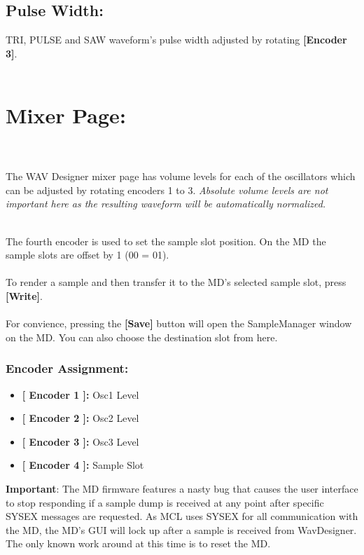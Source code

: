 \subsection{Pulse Width:}
TRI, PULSE and SAW waveform's pulse width adjusted by rotating \textbf{[Encoder 3]}.\\
\\
\section{Mixer Page:}
\\\\
The WAV Designer mixer page has volume levels for each of the oscillators which can be adjusted by rotating encoders 1 to 3. \textit{Absolute volume levels are not important here as the resulting waveform will be automatically normalized.}

\\The fourth encoder is used to set the sample slot position. On the MD the sample slots are offset by 1 (00 = 01).\\
\\
To render a sample and then transfer it to the MD's selected sample slot, press \textbf{[Write]}.\\
\\
For convience, pressing the \textbf{[Save]} button will open the SampleManager window on the MD. You can also choose the destination slot from here.
\subsubsection{Encoder Assignment:}
\begin{itemize}
	\item \textbf{[ Encoder 1 ]: } Osc1 Level
	\item \textbf{[ Encoder 2 ]: } Osc2 Level
	\item \textbf{[ Encoder 3 ]: } Osc3 Level
	\item \textbf{[ Encoder 4 ]: } Sample Slot
\end{itemize}
\textbf{Important}: The MD firmware features a nasty bug that causes the user interface to stop responding if a sample dump is received at any point after specific SYSEX messages are requested. As MCL uses SYSEX for all communication with the MD, the MD's GUI will lock up after a sample is received from WavDesigner. The only known work around at this time is to reset the MD.
